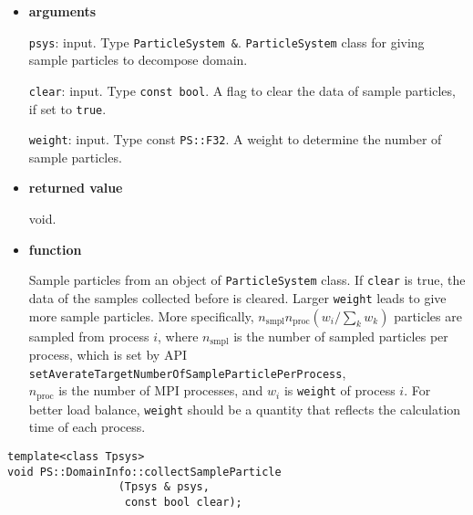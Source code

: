 \begin{itemize}

\item {\bf arguments}

\texttt{psys}: input. Type {\tt ParticleSystem \&}. {\tt ParticleSystem} class
for giving sample particles to decompose domain.

\texttt{clear}: input. Type \texttt{const bool}. A flag to clear the data of sample
particles, if set to \texttt{true}.

\texttt{weight}: input. Type const {\tt PS::F32}. A weight to determine the
number of sample particles.





\item {\bf returned value}

void.

\item {\bf function}

Sample particles from an object of {\tt ParticleSystem} class. If
\texttt{clear} is true, the data of the samples collected before is
cleared. Larger \texttt{weight} leads to give more sample particles.
More specifically, $n_{\mathrm{smpl}}n_{\mathrm{proc}}(w_{i}/\sum_{k}w_{k})$
particles are sampled from process $i$, where $n_{\mathrm{smpl}}$ is the
number of sampled particles per process, which is set by API\\
\texttt{setAverateTargetNumberOfSampleParticlePerProcess},\\
$n_{\mathrm{proc}}$ is the number of MPI processes, and $w_{i}$ is
\texttt{weight} of process $i$. For better load balance, \texttt{weight}
should be a quantity that reflects the calculation time of each process.




\end{itemize}

\begin{screen}
\begin{verbatim}
template<class Tpsys>
void PS::DomainInfo::collectSampleParticle
                 (Tpsys & psys,
                  const bool clear);
\end{verbatim}
\end{screen}

